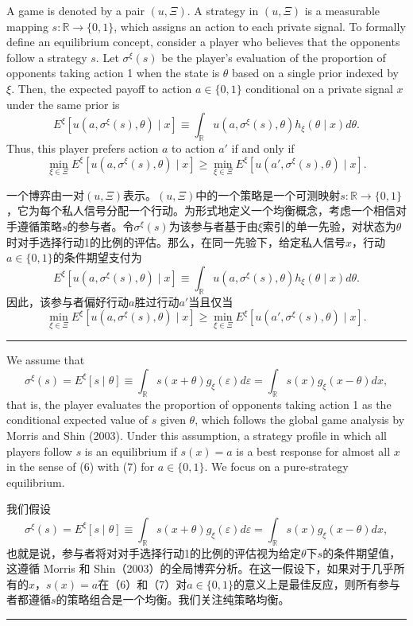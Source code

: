 \documentclass[12pt,a4paper]{article}
\newenvironment{original}
  {\par\medskip\noindent\color{black}\ignorespaces}
  {\par\medskip}
\newenvironment{translation}
  {\par\noindent\color{darkblue}\ignorespaces}
  {\par\medskip\noindent\hrule\par\medskip}
\theoremstyle{definition}
\theoremstyle{remark}
\begin{document}
\begin{original}
A game is denoted by a pair $(u, \Xi)$. A strategy in $(u, \Xi)$ is a measurable mapping $s \colon \mathbb{R} \to \{0, 1\}$, which assigns an action to each private signal. To formally define an equilibrium concept, consider a player who believes that the opponents follow a strategy $s$. Let $\sigma^\xi(s)$ be the player's evaluation of the proportion of opponents taking action 1 when the state is $\theta$ based on a single prior indexed by $\xi$. Then, the expected payoff to action $a \in \{0, 1\}$ conditional on a private signal $x$ under the same prior is
\[
E^\xi[u(a, \sigma^\xi(s), \theta) \mid x] \equiv \int_{\mathbb{R}} u(a, \sigma^\xi(s), \theta) h_\xi(\theta \mid x) d\theta.
\]
Thus, this player prefers action $a$ to action $a'$ if and only if
\[
\min_{\xi \in \Xi} E^\xi[u(a, \sigma^\xi(s), \theta) \mid x] \ge \min_{\xi \in \Xi} E^\xi[u(a', \sigma^\xi(s), \theta) \mid x].
\tag{6}
\]
\end{original}
\begin{translation}
一个博弈由一对$(u, \Xi)$表示。$(u, \Xi)$中的一个策略是一个可测映射$s \colon \mathbb{R} \to \{0, 1\}$，它为每个私人信号分配一个行动。为形式地定义一个均衡概念，考虑一个相信对手遵循策略$s$的参与者。令$\sigma^\xi(s)$为该参与者基于由$\xi$索引的单一先验，对状态为$\theta$时对手选择行动1的比例的评估。那么，在同一先验下，给定私人信号$x$，行动$a \in \{0, 1\}$的条件期望支付为
\[
E^\xi[u(a, \sigma^\xi(s), \theta) \mid x] \equiv \int_{\mathbb{R}} u(a, \sigma^\xi(s), \theta) h_\xi(\theta \mid x) d\theta.
\]
因此，该参与者偏好行动$a$胜过行动$a'$当且仅当
\[
\min_{\xi \in \Xi} E^\xi[u(a, \sigma^\xi(s), \theta) \mid x] \ge \min_{\xi \in \Xi} E^\xi[u(a', \sigma^\xi(s), \theta) \mid x].
\tag{6}
\]
\end{translation}

\begin{original}
We assume that
\[
\sigma^\xi(s) = E^\xi[s \mid \theta] \equiv \int_{\mathbb{R}} s(x + \theta) g_\xi(\varepsilon) d\varepsilon = \int_{\mathbb{R}} s(x) g_\xi(x - \theta) dx,
\tag{7}
\]
that is, the player evaluates the proportion of opponents taking action 1 as the conditional expected value of $s$ given $\theta$, which follows the global game analysis by Morris and Shin (2003). Under this assumption, a strategy profile in which all players follow $s$ is an equilibrium if $s(x) = a$ is a best response for almost all $x$ in the sense of (6) with (7) for $a \in \{0, 1\}$. We focus on a pure-strategy equilibrium.
\end{original}
\begin{translation}
我们假设
\[
\sigma^\xi(s) = E^\xi[s \mid \theta] \equiv \int_{\mathbb{R}} s(x + \theta) g_\xi(\varepsilon) d\varepsilon = \int_{\mathbb{R}} s(x) g_\xi(x - \theta) dx,
\tag{7}
\]
也就是说，参与者将对对手选择行动1的比例的评估视为给定$\theta$下$s$的条件期望值，这遵循 Morris 和 Shin（2003）的全局博弈分析。在这一假设下，如果对于几乎所有的$x$，$s(x) = a$在（6）和（7）对$a \in \{0, 1\}$的意义上是最佳反应，则所有参与者都遵循$s$的策略组合是一个均衡。我们关注纯策略均衡。
\end{translation}
\end{document}
